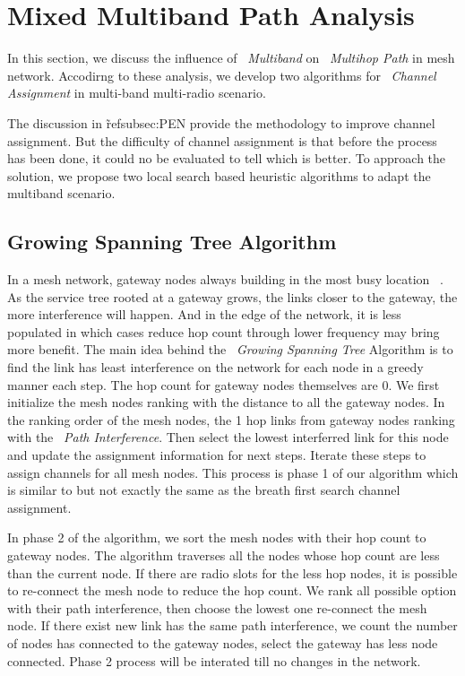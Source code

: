 \section{Mixed Multiband Path Analysis}
\label{sec:wmalgorithms}


In this section, we discuss the influence of ~\emph{Multiband} on ~\emph{Multihop Path} in mesh network. 
Accodirng to these analysis, we develop two algorithms for ~\emph{Channel Assignment} in multi-band multi-radio scenario.




The discussion in \~ref{subsec:PEN} provide the methodology to improve channel assignment. But the difficulty of channel assignment is that before the process has been done, it could no be evaluated to tell which is better.
To approach the solution, we propose two local search based heuristic algorithms to adapt the multiband scenario. 


\subsection{Growing Spanning Tree Algorithm}
In a mesh network, gateway nodes always building in the most busy location ~\cite{robinson2008adding, he2008optimizing}.
As the service tree rooted at a gateway grows, the links closer to the gateway, the more interference will happen.
And in the edge of the network, it is less populated in which cases reduce hop count through lower frequency may bring more benefit. 
The main idea behind the ~\emph{Growing Spanning Tree} Algorithm is 
to find the link has least interference on the network for each node in a greedy manner each step. The hop count for gateway nodes themselves are 0.
We first initialize the mesh nodes ranking with the distance to all the gateway nodes. In the ranking order of the mesh nodes, the 1 hop links from gateway nodes ranking with the ~\emph{Path Interference}. Then select the lowest interferred link for this node and update the assignment information for next steps. 
Iterate these steps to assign channels for all mesh nodes. This process is phase 1 of our algorithm which is similar to but not exactly the same as the breath first search channel assignment. 

In phase 2 of the algorithm, we sort the mesh nodes with their hop count to gateway nodes. 
The algorithm traverses all the nodes whose hop count are less than the current node. If there are radio slots for the less hop nodes, it is possible to re-connect the mesh node to reduce the hop count. We rank all possible option with their path interference, then choose the lowest one re-connect the mesh node. If there exist new link has the same path interference, we count the number of nodes has connected to the gateway nodes, select the gateway has less node connected. Phase 2 process will be interated till no changes in the network.

